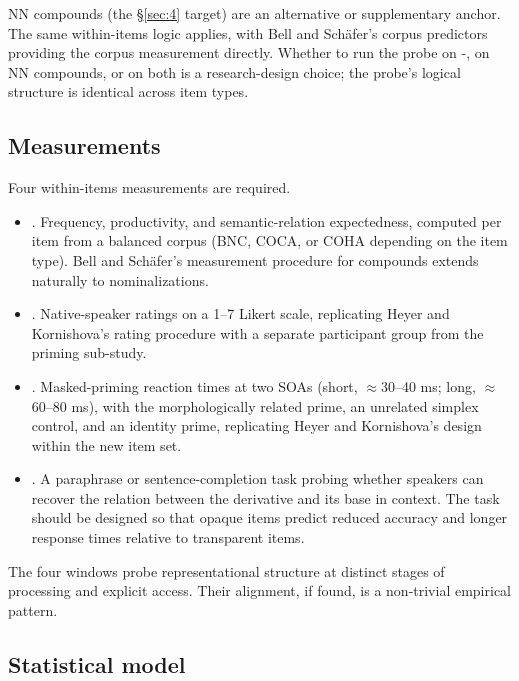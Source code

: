 NN compounds (the §\ref{sec:4} target) are an alternative or supplementary anchor. The same within-items logic applies, with Bell and Schäfer's \autocite*{bell-schafer-2016-modelling-transparency} corpus predictors providing the corpus measurement directly. Whether to run the probe on -, on NN compounds, or on both is a research-design choice; the probe's logical structure is identical across item types.

\subsection{Measurements}

Four within-items measurements are required.

\begin{itemize}
\item
  . Frequency, productivity, and semantic-relation expectedness, computed per item from a balanced corpus (BNC, COCA, or COHA depending on the item type). Bell and Schäfer's measurement procedure for compounds extends naturally to nominalizations.
\item
  . Native-speaker ratings on a 1--7 Likert scale, replicating Heyer and Kornishova's rating procedure with a separate participant group from the priming sub-study.
\item
  . Masked-priming reaction times at two SOAs (short, $\approx$30--40 ms; long, $\approx$60--80 ms), with the morphologically related prime, an unrelated simplex control, and an identity prime, replicating Heyer and Kornishova's design within the new item set.
\item
  . A paraphrase or sentence-completion task probing whether speakers can recover the relation between the derivative and its base in context. The task should be designed so that opaque items predict reduced accuracy and longer response times relative to transparent items.
\end{itemize}

The four windows probe representational structure at distinct stages of processing and explicit access. Their alignment, if found, is a non-trivial empirical pattern.

\subsection{Statistical model}

